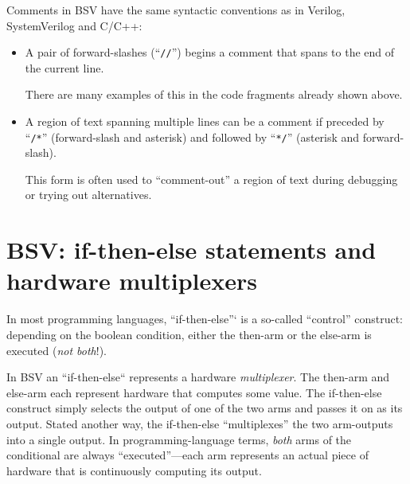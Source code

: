 \label{BSV_Syntax_of_comments}


Comments in BSV have the same syntactic conventions as in Verilog,
SystemVerilog and C/C++:

\begin{itemize}

  \item A pair of forward-slashes (``\verb|//|'') begins a comment
    that spans to the end of the current line.

    There are many examples of this in the code fragments already
    shown above.

  \item A region of text spanning multiple lines can be a comment if
    preceded by ``\verb|/*|'' (forward-slash and asterisk) and followed by
    ``\verb|*/|'' (asterisk and forward-slash).

    This form is often used to ``comment-out'' a region of text during
    debugging or trying out alternatives.

\end{itemize}


\section{BSV: if-then-else statements and hardware multiplexers}

\label{BSV_Combo_Circuits_if_then_else}


In most programming languages, ``if-then-else''` is a so-called
``control'' construct: depending on the boolean condition, either the
then-arm or the else-arm is executed (\emph{not both}!).

In BSV an ``if-then-else`` represents a hardware \emph{multiplexer}.
The then-arm and else-arm each represent hardware that computes some
value.  The if-then-else construct simply selects the output of one of
the two arms and passes it on as its output.  Stated another way, the
if-then-else ``multiplexes'' the two arm-outputs into a single output.
In programming-language terms, \emph{both} arms of the conditional are
always ``executed''---each arm represents an actual piece of hardware
that is continuously computing its output.

